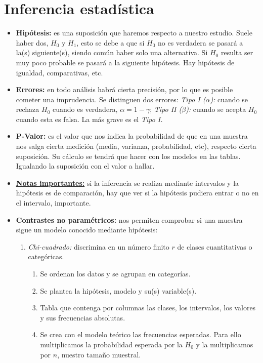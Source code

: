 \documentclass[a4paper, twocolumn, 10pt]{article}
\begin{document}
\section{Inferencia estadística}

\begin{itemize}
	\item \textbf{Hipótesis:} es una suposición que haremos respecto a nuestro estudio. Suele haber dos, $H_0$ y $H_1$, esto se debe a que si $H_0$ no es verdadera se pasará a la(s) siguiente(s), siendo común haber solo una alternativa. Si $H_0$ resulta ser muy poco probable se pasará a la siguiente hipótesis. Hay hipótesis de igualdad, comparativas, etc.
	\item \textbf{Errores:} en todo análisis habrá cierta precisión, por lo que es posible cometer una imprudencia. Se distinguen dos errores: \textit{Tipo I ($\alpha$):} cuando se rechaza $H_0$ cuando es verdadera, $\alpha = 1-\gamma$; \textit{Tipo II ($\beta$):} cuando se acepta $H_0$ cuando esta es falsa. La más grave es el \textit{Tipo I.}
	\item \textbf{P-Valor:} es el valor que nos indica la probabilidad de que en una muestra nos salga cierta medición (media, varianza, probabilidad, etc), respecto cierta suposición. Su cálculo se tendrá que hacer con los modelos en las tablas. Igualando la suposición con el valor a hallar.
	\item \textbf{\underline{Notas importantes:}} si la inferencia se realiza mediante intervalos y la hipótesis es de comparación, hay que ver si la hipótesis pudiera entrar o no en el intervalo, importante.
	\item \textbf{Contrastes no paramétricos:} nos permiten comprobar si una muestra sigue un modelo conocido mediante hipótesis:
	\begin{enumerate}
		\item \textit{Chi-cuadrado:} discrimina en un número finito $r$ de clases cuantitativas o categóricas.
		\begin{enumerate}
			\item Se ordenan los datos y se agrupan en categorías.
			\item Se plantea la hipótesis, modelo y su(s) variable(s).
			\item Tabla que contenga por columnas las clases, los intervalos, los valores y sus frecuencias absolutas.
			\item Se crea con el modelo teórico las frecuencias esperadas. Para ello multiplicamos la probabilidad esperada por la $H_0$ y la multiplicamos por $n$, nuestro tamaño muestral.

\end{enumerate}
\end{enumerate}
\end{itemize}
\end{document}

